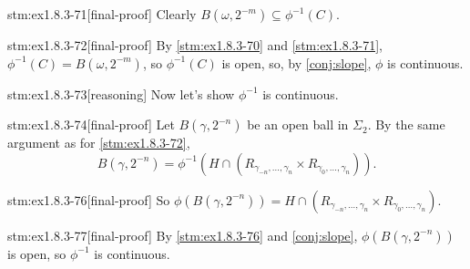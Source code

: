 \begin{stm}{stm:ex1.8.3-71}[final-proof]
Clearly $B(\omega, 2^{-m}) \subseteq \phi^{-1}(C)$.
\end{stm}

\begin{stm}{stm:ex1.8.3-72}[final-proof]
By \ref{stm:ex1.8.3-70} and \ref{stm:ex1.8.3-71}, $\phi^{-1}(C) = B(\omega, 2^{-m})$, so $\phi^{-1}(C)$ is open, so, by \ref{conj:slope}, $\phi$ is continuous.
\end{stm}

\begin{stm}{stm:ex1.8.3-73}[reasoning]
Now let’s show $\phi^{-1}$ is continuous.
\end{stm}

\begin{stm}{stm:ex1.8.3-74}[final-proof]
Let $B(\gamma, 2^{-n})$ be an open ball in $\Sigma_2$. By the same argument as for \ref{stm:ex1.8.3-72},
\[
B(\gamma, 2^{-n}) = \phi^{-1}(H \cap (R_{\gamma_{-n}, \ldots, \gamma_n} \times R_{\gamma_0, \ldots, \gamma_n})).
\]
\end{stm}

\begin{stm}{stm:ex1.8.3-76}[final-proof]
So $\phi(B(\gamma, 2^{-n})) = H \cap (R_{\gamma_{-n}, \ldots, \gamma_n} \times R_{\gamma_0, \ldots, \gamma_n})$.
\end{stm}

\begin{stm}{stm:ex1.8.3-77}[final-proof]
By \ref{stm:ex1.8.3-76} and \ref{conj:slope}, $\phi(B(\gamma, 2^{-n}))$ is open, so $\phi^{-1}$ is continuous.
\end{stm}
